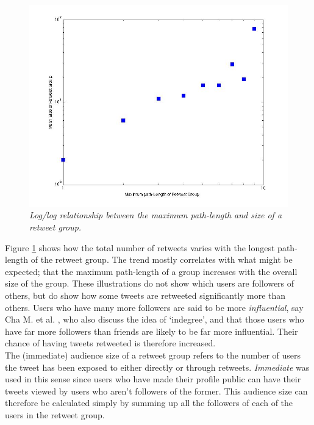 \begin{figure}[h]
\includegraphics[scale=0.35]{4.Chapter1/Media/retweets-pathlength.jpg} 
\caption{\textit{Log/log relationship between the maximum path-length and size of a retweet group.}}
\label{fig:totalretweets-pathlength}
\end{figure}
Figure \ref{fig:totalretweets-pathlength} shows how the total number of retweets varies with the longest path-length of the retweet group. The trend mostly correlates with what might be expected; that the maximum path-length of a group increases with the overall size of the group. These illustrations do not show which users are followers of others, but do show how some tweets are retweeted significantly more than others. Users who have many more followers are said to be more \textit{influential}, say Cha M. et al. \cite{cha10}, who also discuss the idea of `indegree', and that those users who have far more followers than friends are likely to be far more influential. Their chance of having tweets retweeted is therefore increased.\\
The (immediate) audience size of a retweet group refers to the number of users the tweet has been exposed to either directly or through retweets. \textit{Immediate} was used in this sense since users who have made their profile public can have their tweets viewed by users who aren't followers of the former. This audience size can therefore be calculated simply by summing up all the followers of each of the users in the retweet group.\\
